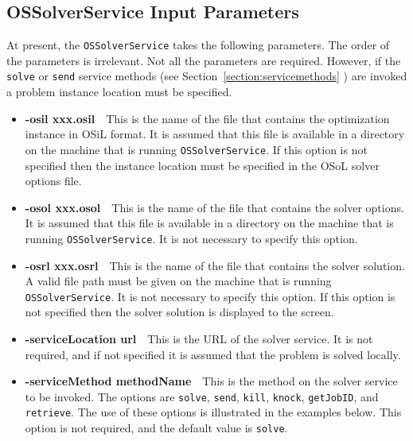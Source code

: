 \documentclass[11pt]{article}
\renewcommand{\_}{{\char"5F}}
\renewcommand{\{}{{\char"7B}}
\renewcommand{\}}{{\char"7D}}
\renewcommand{\^}{{\char"0D}}
\renewcommand{\'}{{\char"0D}}
\begin{document}
\begin{enumerate}[Step 1:]
\subsection{OSSolverService Input Parameters}

At present, the {\tt OSSolverService} takes the following parameters. The order of the parameters is irrelevant.
Not all the parameters are required. However, if the {\tt solve} or {\tt send}%
 service    methods  (see Section~\ref{section:servicemethods} ) are invoked
a problem instance location must be specified.

\begin{itemize}

\item[] {\bf -osil xxx.osil}\ \ This is the name of the file that contains the optimization instance in
OSiL  format. It is assumed that this file is available in a directory on the
machine that is running {\tt OSSolverService}.
If this option is not specified then the instance location must be specified in the OSoL solver options file.

\item[] {\bf -osol xxx.osol}\ \ This is the name of the file that contains the solver options. It is assumed that
this file is available in a directory on the machine that is running {\tt OSSolverService}. It is not necessary to
specify this option.

\item[] {\bf -osrl xxx.osrl}\ \ This is the name of the file that contains the solver solution. A valid file path
must be given on the machine that is running {\tt OSSolverService}. It is not necessary to specify this option.
If this option is not specified then the solver solution is displayed to the screen.

\item[] {\bf -serviceLocation url}\ \ This is the URL of the solver service. It is not required, and if not specified it is assumed that the problem is solved locally.

\item[] {\bf -serviceMethod  methodName}\ \ This is  the method on the solver service to be invoked.
The options are {\tt solve}, {\tt send},
{\tt kill}, {\tt knock},
{\tt getJobID}, and {\tt retrieve}.
The use of these options is illustrated in the examples below. This option is not required, and the default
value is {\tt solve}.


\end{itemize}
\end{enumerate}
\end{document}
